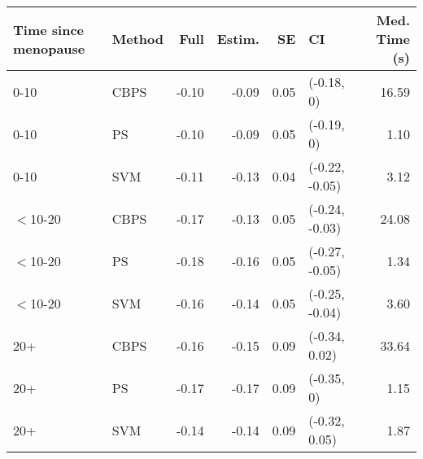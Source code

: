 \documentclass[border=1mm, preview]{standalone}
\begin{document}
\begin{table}
\centering
\begin{tabular}[t]{llrrrlr}
\toprule
Time since menopause & Method & Full & Estim. & SE & CI & Med. Time (s)\\
\midrule
0-10 & CBPS & -0.10 & -0.09 & 0.05 & (-0.18, 0) & 16.59\\
0-10 & PS & -0.10 & -0.09 & 0.05 & (-0.19, 0) & 1.10\\
0-10 & SVM & -0.11 & -0.13 & 0.04 & (-0.22, -0.05) & 3.12\\
$<$10-20 & CBPS & -0.17 & -0.13 & 0.05 & (-0.24, -0.03) & 24.08\\
$<$10-20 & PS & -0.18 & -0.16 & 0.05 & (-0.27, -0.05) & 1.34\\
\addlinespace
$<$10-20 & SVM & -0.16 & -0.14 & 0.05 & (-0.25, -0.04) & 3.60\\
20+ & CBPS & -0.16 & -0.15 & 0.09 & (-0.34, 0.02) & 33.64\\
20+ & PS & -0.17 & -0.17 & 0.09 & (-0.35, 0) & 1.15\\
20+ & SVM & -0.14 & -0.14 & 0.09 & (-0.32, 0.05) & 1.87\\
\bottomrule
\end{tabular}
\end{table}
\end{document}
